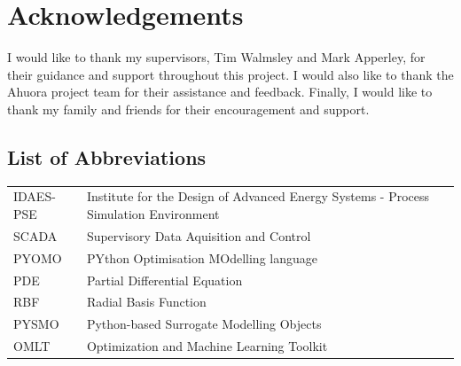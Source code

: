 \documentclass[12pt]{report}
\begin{document}
\chapter*{Acknowledgements}

I would like to thank my supervisors, Tim Walmsley and Mark Apperley, for their guidance and support throughout this project. I would also like to thank the Ahuora project team for their assistance and feedback. Finally, I would like to thank my family and friends for their encouragement and support.

\tableofcontents
\listoffigures
\listoftables

\section*{List of Abbreviations}

\begin{tabular}{lL{13cm}}
    IDAES-PSE & Institute for the Design of Advanced Energy Systems - Process Simulation Environment \\
    SCADA & Supervisory Data Aquisition and Control \\
    PYOMO & PYthon Optimisation MOdelling language \\
    PDE & Partial Differential Equation \\
    RBF & Radial Basis Function \\
    PYSMO & Python-based Surrogate Modelling Objects \\
    OMLT & Optimization and Machine Learning Toolkit \\
\end{tabular}

\newpage
{}









%

%
%






\end{document}
